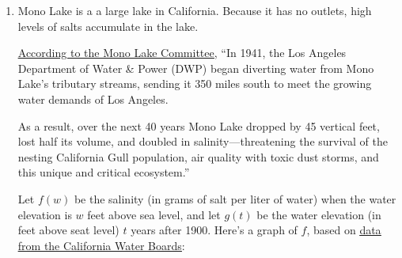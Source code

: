 \documentclass{article}
\makeatletter
\let\@href=\href
\renewcommand{\href}[2]{\@href{#1}{\ul{#2}}}
\makeatother
\begin{document}
\begin{enumerate}
\begin{enumerate}
  \item

    \begin{grading}
      1 point
    \end{grading}

    \begin{problem}[\stretch{0.25}]
      Who ends up with the correct graph and why?
    \end{problem}

    \begin{solution} 
      Harry's graph is correct. We can tell because the graph of $f$ should have a horizontal asymptote at $y=-2$.
      The order we should perform a vertical shift and a vertical stretch follows the order of operations.
    \end{solution}

  \item

    \begin{grading}
      1 point
    \end{grading}

    \begin{problem}[\nstretch{0.25}]
      What is the algebraic formula for the incorrect graph?
    \end{problem}

    \begin{solution} 
      $f(x) = 5(\frac{1}{x} - 2) $.  
    \end{solution}

  \end{enumerate} 

\item  

  Mono Lake is a a large lake in California. Because it has no outlets, high levels of salts accumulate in the lake.

  \href{https://www.monolake.org/learn/stateofthelake/}{According to
    the Mono Lake Committee}, ``In 1941, the Los Angeles Department of
  Water \& Power (DWP) began diverting water from Mono Lake’s
  tributary streams, sending it 350 miles south to meet the growing
  water demands of Los Angeles.

  As a result, over the next 40 years Mono Lake dropped by 45 vertical
  feet, lost half its volume, and doubled in salinity—threatening the
  survival of the nesting California Gull population, air quality with
  toxic dust storms, and this unique and critical ecosystem.''

  Let $f(w)$ be the salinity (in grams of salt per liter of water) when the water elevation is $w$ feet above sea level, and let $g(t)$ be the water elevation (in feet above seat level) $t$ years after 1900. Here's a graph of $f$, based on \href{https://www.waterboards.ca.gov/waterrights/water_issues/programs/mono_lake/docs/backgroundinfo.pdf}{data from the California Water Boards}:


\end{enumerate}
\end{document}
